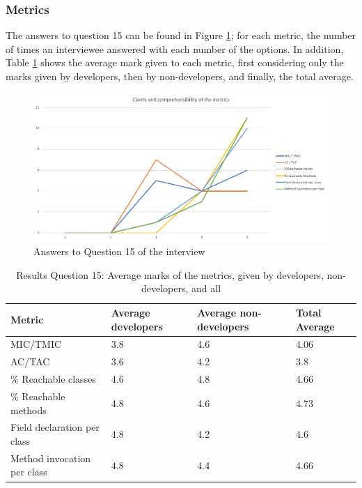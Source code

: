 \subsubsection{Metrics}

The answers to question 15 can be found in Figure \ref{fig:interview-15}; for each metric, the number of times an interviewee answered with each number of the options. In addition, Table \ref{table:interview-15} shows the average mark given to each metric, first considering only the marks given by developers, then by non-developers, and finally, the total average.

\begin{figure}[ht!]
\begin{center}
\includegraphics[width=\textwidth]{figures/interview/Question15.png}
\caption{Answers to Question 15 of the interview}
\label{fig:interview-15}
\end{center}
\end{figure}

\begin{table}[ht!]
    \begin{center}
    \begin{tabular}{|l|l|l|l|}
    \hline
    Metric                      & Average developers  & Average non-developers  & Total Average \\
    \hline
    MIC/TMIC                    & 3.8                 & 4.6               & 4.06 \\
    AC/TAC                      & 3.6                 & 4.2               & 3.8 \\
    \% Reachable classes        & 4.6                 & 4.8               & 4.66 \\
    \% Reachable methods        & 4.8                 & 4.6               & 4.73 \\
    Field declaration per class & 4.8                 & 4.2               & 4.6 \\
    Method invocation per class & 4.8                 & 4.4               & 4.66 \\
    \hline
    \end{tabular}
    \end{center}
    \caption{Results Question 15: Average marks of the metrics, given by developers, non-developers, and all}
    \label{table:interview-15}
\end{table}

